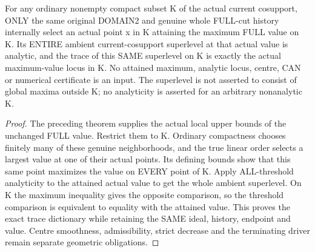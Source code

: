\begin{theorem}
\label{hir:original-full-cut-compact-attained-analytic-superlevel}
\leanok
For any ordinary nonempty compact subset K of the actual current cosupport,
ONLY the same original DOMAIN2 and genuine whole FULL-cut history internally
select an actual point x in K attaining the maximum FULL value on K. Its
ENTIRE ambient current-cosupport superlevel at that actual value is analytic,
and the trace of this SAME superlevel on K is exactly the actual maximum-value
locus in K. No attained maximum, analytic locus, centre, CAN or numerical
certificate is an input. The superlevel is not asserted to consist of global
maxima outside K; no analyticity is asserted for an arbitrary nonanalytic K.
\end{theorem}
\begin{proof}
The preceding theorem supplies the actual local upper bounds of the unchanged
FULL value. Restrict them to K. Ordinary compactness chooses finitely many of
these genuine neighborhoods, and the true linear order selects a largest
value at one of their actual points. Its defining bounds show that this same
point maximizes the value on EVERY point of K. Apply ALL-threshold analyticity
to the attained actual value to get the whole ambient superlevel. On K the
maximum inequality gives the opposite comparison, so the threshold comparison
is equivalent to equality with the attained value. This proves the exact trace
dictionary while retaining the SAME ideal, history, endpoint and value. Centre
smoothness, admissibility, strict decrease and the terminating driver remain
separate geometric obligations.
\end{proof}
